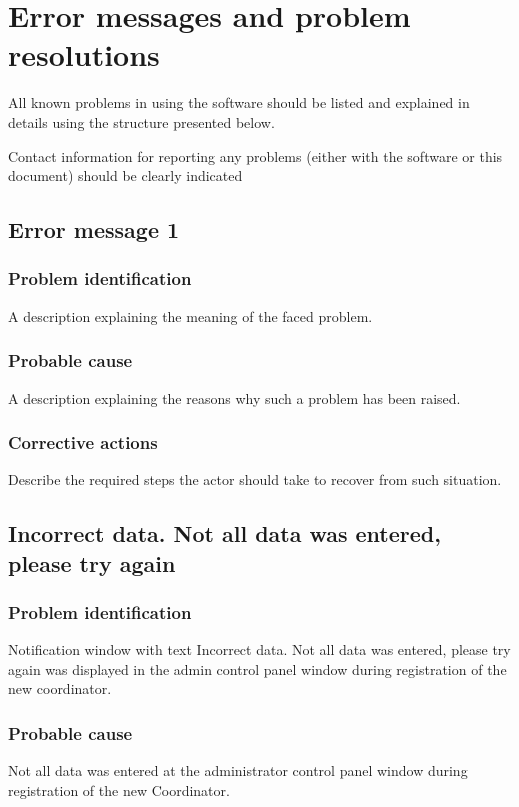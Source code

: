 
\chapter{Error messages and problem resolutions}
\label{chap:error_messages}

All known problems in using the software should be listed and explained in
details using the structure presented below.

Contact information for reporting any problems (either with the software or
this document) should be clearly indicated


\section{Error message 1}

\subsection{Problem identification}
A description explaining the meaning of the faced problem.

\subsection{Probable cause}
A description explaining the reasons why such a problem has been raised.

\subsection{Corrective actions}
Describe the required steps the actor should take to recover from such situation.


\section{Incorrect data. Not all data was entered, please try again}

\subsection{Problem identification}
Notification window with text Incorrect data. Not all data was entered, please try again
was displayed in the admin control panel window during registration of the new coordinator.

\subsection{Probable cause}
Not all data was entered at the administrator control panel window during
registration of the new Coordinator.

